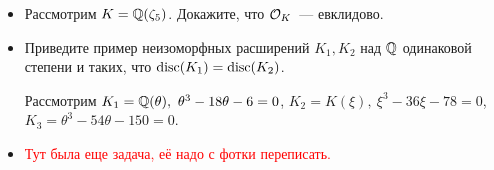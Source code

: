 	\begin{homework}
	\begin{itemize}
		\item Рассмотрим $K = \mathbb{Q}(\zeta_{5})$. Докажите, что $\mathcal{O}_{K}$~--- евклидово. 

		\item Приведите пример неизоморфных расширений $K_1, K_2$ над $\mathbb{Q}$ одинаковой степени и таких, что $\operatorname{disc}(K_1) = \operatorname{disc}(K_2)$.

		Рассмотрим $K_1 = \mathbb{Q}(\theta), \ \theta^3 - 18\theta - 6 = 0$, $K_2 = K(\xi), \ \xi^3 - 36\xi - 78 = 0$, $K_3 = \theta^3 - 54\theta - 150 = 0$.

		\item \textcolor{red}{Тут была еще задача, её надо с фотки переписать.} 
	\end{itemize}
	\end{homework}




